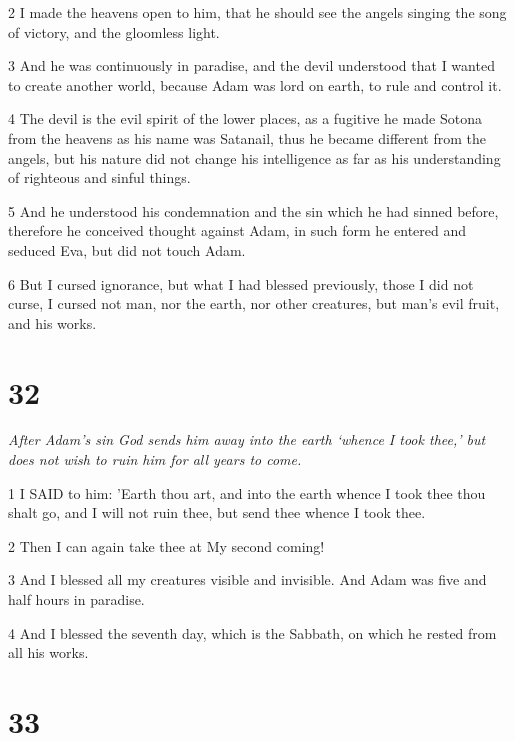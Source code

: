 \par 2 I made the heavens open to him, that he should see the angels singing the song of victory, and the gloomless light.

\par 3 And he was continuously in paradise, and the devil understood that I wanted to create another world, because Adam was lord on earth, to rule and control it.

\par 4 The devil is the evil spirit of the lower places, as a fugitive he made Sotona from the heavens as his name was Satanail, thus he became different from the angels, but his nature did not change his intelligence as far as his understanding of righteous and sinful things.

\par 5 And he understood his condemnation and the sin which he had sinned before, therefore he conceived thought against Adam, in such form he entered and seduced Eva, but did not touch Adam.

\par 6 But I cursed ignorance, but what I had blessed previously, those I did not curse, I cursed not man, nor the earth, nor other creatures, but man's evil fruit, and his works.

\chapter{32}

\par \textit{After Adam's sin God sends him away into the earth ‘whence I took thee,’ but does not wish to ruin him for all years to come.}

\par 1 I SAID to him: 'Earth thou art, and into the earth whence I took thee thou shalt go, and I will not ruin thee, but send thee whence I took thee.

\par 2 Then I can again take thee at My second coming!

\par 3 And I blessed all my creatures visible and invisible. And Adam was five and half hours in paradise.

\par 4 And I blessed the seventh day, which is the Sabbath, on which he rested from all his works.

\chapter{33}

